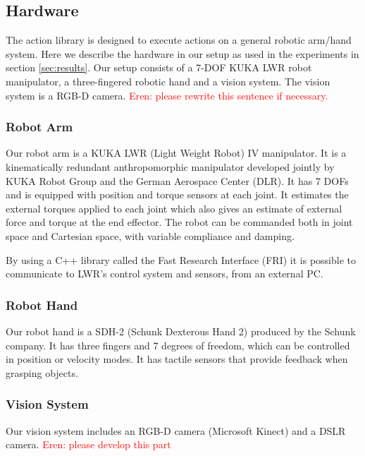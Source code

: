 \subsection{Hardware}
\label{sec:hardware}
The action library is designed to execute actions on a general robotic arm/hand system.
Here we describe the hardware in our setup as used in the experiments in section \ref{sec:results}.
Our setup consists of a 7-DOF KUKA LWR robot manipulator, a three-fingered robotic hand and a vision system. 
The vision system is a RGB-D camera. \textcolor{red}{Eren: please rewrite this sentence if necessary.}

\subsubsection{Robot Arm}
Our robot arm is a KUKA LWR (Light Weight Robot) IV manipulator.
It is a kinematically redundant anthropomorphic manipulator developed jointly by KUKA Robot Group and the German Aerospace Center (DLR).
It has 7 DOFs and is equipped with position and torque sensors at each joint.
It estimates the external torques applied to each joint which also gives an estimate of external force and torque at the end effector.
The robot can be commanded both in joint space and Cartesian space, with variable compliance and damping.

By using a C++ library called the Fast Research Interface (FRI) it is possible to communicate to LWR's control system and sensors, from an external PC.

\subsubsection{Robot Hand}
Our robot hand is a SDH-2 (Schunk Dexterous Hand 2) produced by the Schunk company.
It has three fingers and 7 degrees of freedom, which can be controlled in position or velocity modes.
It has tactile sensors that provide feedback when grasping objects.

\subsubsection{Vision System}
Our vision system includes an RGB-D camera (Microsoft Kinect) and a DSLR camera.
\textcolor{red}{Eren: please develop this part}

